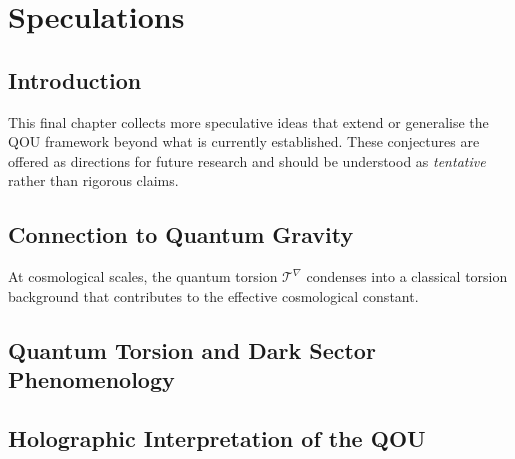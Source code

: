 \chapter{Speculations}
\label{chap:speculations}

\section{Introduction}
\label{sec:spec-intro}

This final chapter collects more speculative ideas that extend or generalise
the QOU framework beyond what is currently established.  These conjectures are
offered as directions for future research and should be understood as
\emph{tentative} rather than rigorous claims.

\section{Connection to Quantum Gravity}
\label{sec:spec-qg}


\begin{conjecture}
  \label{conj:gravitational-torsion}
  At cosmological scales, the quantum torsion $\mathcal{T}^\nabla$ condenses
  into a classical torsion background that contributes to the effective
  cosmological constant.
\end{conjecture}

\section{Quantum Torsion and Dark Sector Phenomenology}
\label{sec:spec-dark}


\section{Holographic Interpretation of the QOU}
\label{sec:spec-holography}

